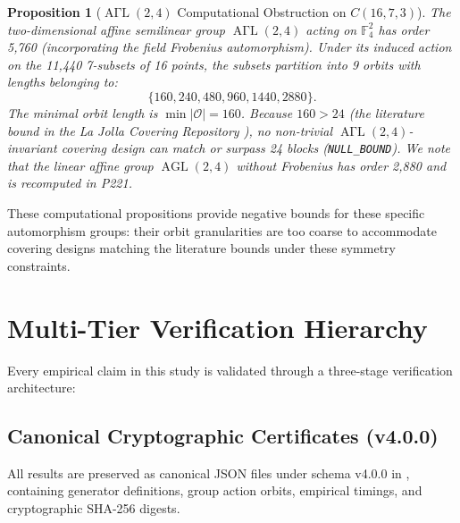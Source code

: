 \documentclass[11pt,a4paper]{article}
\newtheorem{proposition}[theorem]{Proposition}
\begin{document}
\begin{proposition}[$\operatorname{A\Gamma L}(2, 4)$ Computational Obstruction on $C(16, 7, 3)$]
\label{prop:agl2_4}
The two-dimensional affine semilinear group $\operatorname{A\Gamma L}(2, 4)$ acting on $\mathbb{F}_4^2$ has order 5,760 (incorporating the field Frobenius automorphism). Under its induced action on the 11,440 7-subsets of 16 points, the subsets partition into 9 orbits with lengths belonging to:
\begin{equation}
\{160, 240, 480, 960, 1440, 2880\}.
\end{equation}
The minimal orbit length is $\min |\mathcal{O}| = 160$. Because $160 > 24$ (the literature bound in the La Jolla Covering Repository \cite{gordon2026ljcr}), no non-trivial $\operatorname{A\Gamma L}(2, 4)$-invariant covering design can match or surpass 24 blocks (\texttt{NULL\_BOUND}). We note that the linear affine group $\operatorname{AGL}(2, 4)$ without Frobenius has order 2,880 and is recomputed in P221.
\end{proposition}

These computational propositions provide negative bounds for these specific automorphism groups: their orbit granularities are too coarse to accommodate covering designs matching the literature bounds under these symmetry constraints.

\section{Multi-Tier Verification Hierarchy}
\label{sec:verification}

Every empirical claim in this study is validated through a three-stage verification architecture:

\subsection{Canonical Cryptographic Certificates (v4.0.0)}
\label{sec:certs}
All results are preserved as canonical JSON files under schema v4.0.0 in , containing generator definitions, group action orbits, empirical timings, and cryptographic SHA-256 digests.
\end{document}
